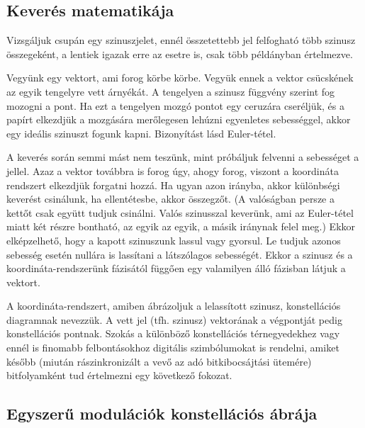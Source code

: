 \documentclass[12pt,a4paper]{article}
\begin{document}
\subsection{Keverés matematikája}
Vizsgáljuk csupán egy szinuszjelet, ennél összetettebb jel felfogható több szinusz összegeként, a lentiek igazak erre az esetre is, csak több példányban értelmezve.
\par
Vegyünk egy vektort, ami forog körbe körbe. Vegyük ennek a vektor csücskének az egyik tengelyre vett árnyékát. A tengelyen a szinusz függvény szerint fog mozogni a pont. Ha ezt a tengelyen mozgó pontot egy ceruzára cseréljük, és a papírt elkezdjük a mozgására merőlegesen lehúzni egyenletes sebességgel, akkor egy ideális szinuszt fogunk kapni. Bizonyítást lásd Euler-tétel.
\par
A keverés során semmi mást nem teszünk, mint próbáljuk felvenni a sebességet a jellel. Azaz a vektor továbbra is forog úgy, ahogy forog, viszont a koordináta rendszert elkezdjük forgatni hozzá. Ha ugyan azon irányba, akkor különbségi keverést csinálunk, ha ellentétesbe, akkor összegzőt. (A valóságban persze a kettőt csak együtt tudjuk csinálni. Valós szinusszal keverünk, ami az Euler-tétel miatt két részre bontható, az egyik az egyik, a másik iránynak felel meg.) Ekkor elképzelhető, hogy a kapott szinuszunk lassul vagy gyorsul. Le tudjuk azonos sebesség esetén nullára is lassítani a látszólagos sebességét. Ekkor a szinusz és a koordináta-rendszerünk fázisától függően egy valamilyen álló fázisban látjuk a vektort.
\par
A koordináta-rendszert, amiben ábrázoljuk a lelassított szinusz, konstellációs diagramnak nevezzük. A vett jel (tfh. szinusz) vektorának a végpontját pedig konstellációs pontnak. Szokás a különböző konstellációs térnegyedekhez vagy ennél is finomabb felbontásokhoz digitális szimbólumokat is rendelni, amiket később (miután rászinkronizált a vevő az adó bitkibocsájtási ütemére) bitfolyamként tud értelmezni egy következő fokozat.
\clearpage
\subsection{Egyszerű modulációk konstellációs ábrája}
\end{document}
